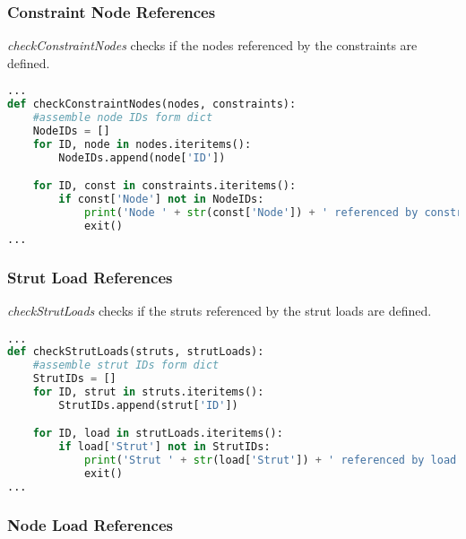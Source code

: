 \subsubsection{Constraint Node References}
\label{sec:inputcheck-checkConstraintNodes}

\textit{checkConstraintNodes} checks if the nodes referenced by the constraints are defined.

\begin{inconsolata}
\begin{minipage}{\linewidth}
\begin{lstlisting}[language=python]
...
def checkConstraintNodes(nodes, constraints):
    #assemble node IDs form dict
    NodeIDs = []
    for ID, node in nodes.iteritems():
        NodeIDs.append(node['ID'])

    for ID, const in constraints.iteritems():
        if const['Node'] not in NodeIDs:
            print('Node ' + str(const['Node']) + ' referenced by constraint ' + str(ID) + ' but not defined.')
            exit()
...
\end{lstlisting}
\end{minipage}
\end{inconsolata}

\pagebreak

\subsubsection{Strut Load References}
\label{sec:inputcheck-checkStrutLoads}

\textit{checkStrutLoads} checks if the struts referenced by the strut loads are defined.

\begin{inconsolata}
\begin{minipage}{\linewidth}
\begin{lstlisting}[language=python]
...
def checkStrutLoads(struts, strutLoads):
    #assemble strut IDs form dict
    StrutIDs = []
    for ID, strut in struts.iteritems():
        StrutIDs.append(strut['ID'])

    for ID, load in strutLoads.iteritems():
        if load['Strut'] not in StrutIDs:
            print('Strut ' + str(load['Strut']) + ' referenced by load ' + str(ID) + ' but not defined.')
            exit()
...
\end{lstlisting}
\end{minipage}
\end{inconsolata}

\subsubsection{Node Load References}
\label{sec:inputcheck-checkNodeLoads}

